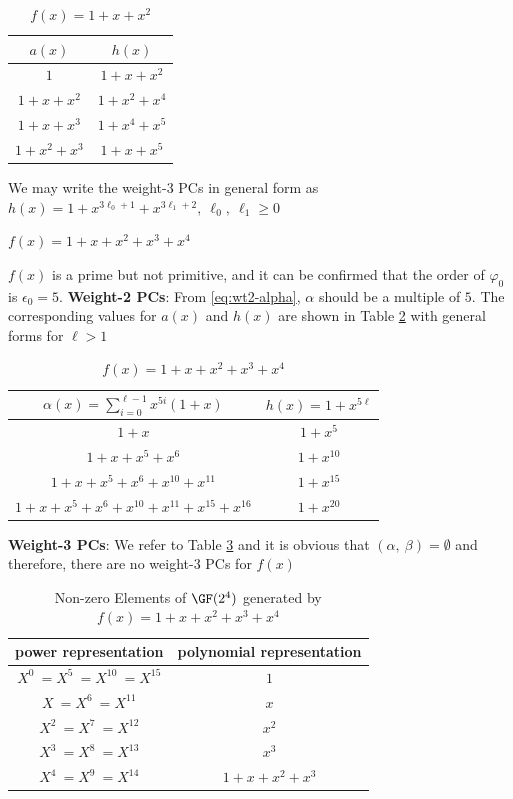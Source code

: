 \begin{example}
\begin{table}[htbp]
 \caption{$f(x)=1+x+x^2$}
\centering
 \begin{tabular}{c c} 
 \hline
 $a(x)$ & $h(x)$\\ [0.5ex] 
 \hline\hline
$1$ & $1+x+x^2$\\ 
\hline
$1+x+x^2$ &  $1+x^2+x^4$\\
\hline
$1+x+x^3$ & $1+x^4+x^5$\\
\hline
$1+x^2+x^3$ & $1+x+x^5$ 
 \end{tabular}
 \label{novelTab8}
\end{table}

We may write the weight-3 PCs in general form as $h(x)=1+x^{3\ell_0+1}+x^{3\ell_1+2},~\ell_0,~\ell_1 \geq 0$ 

\label{ex-1}
\end{example}




\begin{example}
$f(x)=1+x+x^2+x^3+x^4$

$f(x)$ is a prime but not primitive, and it can be confirmed that the order of $\varphi_0$ is $\epsilon_0=5$.
\newline
\textbf{Weight-2 PCs}: 
From \eqref{eq:wt2-alpha}, $\alpha$ should be a multiple of $5$. The corresponding values for $a(x)$ and $h(x)$ are shown in Table \ref{novelTab3} with general forms for $\ell>1$

\begin{table}[htbp]
\caption{$f(x)=1+x+x^2+x^3+x^4$}
\centering
\begin{tabular}{c c} 
 \hline
 $\alpha(x)=\sum_{i=0}^{\ell-1} x^{5i}(1+x)$ & $h(x)=1+x^{5\ell}$  \\ [0.5ex] 
 \hline\hline
$1+x$ &$1+x^5$\\ 
$1+x+x^5+x^6$ &$1+x^{10}$  \\
$1+x+x^5+x^6+x^{10}+x^{11}$ & $1+x^{15}$ \\
$1+x+x^5+x^6+x^{10}+x^{11}+x^{15}+x^{16}$ &$1+x^{20}$  
 \end{tabular}
 \label{novelTab3}
\end{table}
\newpage
\textbf{Weight-3 PCs}:
We refer to Table \ref{novelTabWt3-2} and it is obvious that $(\alpha,~\beta)=\emptyset$ and therefore, there are no weight-3 PCs for $f(x)$
 \begin{table}[htbp]
 \caption{Non-zero Elements of $\GF (2^4)$ generated by $f(x)=1+x+x^2+x^3+x^4$}
\centering
 \begin{tabular}{c c} 
 \hline
 power representation & polynomial representation \\ [0.5ex] 
 \hline\hline
$X^0~=X^5~=X^{10}~=X^{15}$ & $1$\\
\hline
$X~=X^6~=X^{11}$ & $x$\\
\hline
$X^2~=X^7~=X^{12}$ &  $x^2$\\
\hline
$X^3~=X^8~=X^{13}$ &  $x^3$\\
\hline
$X^4~=X^9~=X^{14}$ &  $1+x+x^2+x^3$\\
\hline
 \end{tabular}
 \label{novelTabWt3-2}
\end{table}
\label{ex-2}
\end{example}

